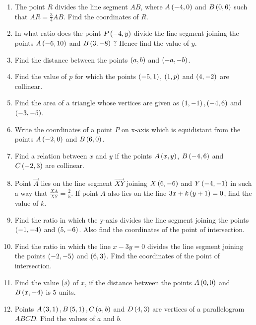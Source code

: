 \begin{enumerate}
\item The point $R$ divides the line segment $AB$, where $A\left(- 4, 0\right)$ and $B\left(0, 6\right)$ such that $AR=\frac{3}{4} AB$. Find the coordinates of $R$.

\item In what ratio does the point $P\left(- 4, y\right)$ divide the line segment joining the points $A\left(- 6, 10\right)$ and $B\left(3, - 8\right)$ ? Hence find the value of $y$.

\item Find the distance between the points $\left(a, b\right)$ and $\left(-a, -b\right)$.

\item Find the value of $p$ for which the points $\left(-5, 1\right)$, $\left(1, p\right)$ and $\left(4, -2\right)$ are collinear.

\item Find the area of a triangle whose vertices are given as $\left(1, - 1\right), \left(- 4, 6\right)$ and $\left( -3, - 5\right)$.

\item Write the coordinates of a point $P$ on x-axis which is equidistant from the points $A\left(- 2, 0\right)$ and $B\left(6, 0\right)$.

\item Find a relation between $x$ and $y$ if the points $A\left(x, y\right)$,  $B\left(-4, 6\right) $ and $C\left(-2, 3\right)$ are collinear.

\item Point $\Vec{A}$ lies on the line segment $\Vec{XY}$ joining $X\left(6, - 6\right)$ and $Y\left(-4,-1\right)$ in such a way that $\frac{XA}{XY}=\frac{2}{5}$. If point $A$ also lies on the line $3x + k \left(y + 1\right)= 0$, find the value of $k$.

\item Find the ratio in which the y-axis divides the line segment joining the points $\left(-1, -4\right)$ and $\left(5, -6\right)$. Also find the coordinates of the point of intersection.

\item Find the ratio in which the line $x-3y = 0$ divides the line segment joining the points $\left( -2, -5\right)$ and $\left(6, 3\right)$. Find the coordinates of the point of intersection.

\item Find the value $\left(s\right)$ of $x$, if the distance between the points $A\left(0, 0\right)$ and $B \left(x,-4\right)$  is $5$ units.

\item Points $A\left(3, 1\right), B\left(5, 1\right),C\left(a, b\right)$ and $D\left(4, 3\right)$ are vertices of a parallelogram $ABCD$. Find the values of $a$ and $b$.


\end{enumerate}
